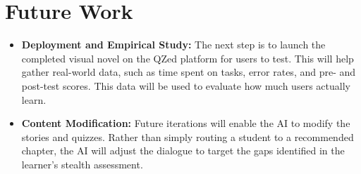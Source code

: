 \documentclass[12pt,a4paper]{report}
\begin{document}
\section{Future Work}

\begin{itemize}
    \item \textbf{Deployment and Empirical Study:} The next step is to launch the completed visual novel on the QZed platform for users to test. This will help gather real-world data, such as time spent on tasks, error rates, and pre- and post-test scores. This data will be used to evaluate how much users actually learn.

    \item \textbf{Content Modification:} Future iterations will enable the AI to modify the stories and quizzes. Rather than simply routing a student to a recommended chapter, the AI will adjust the dialogue to target the gaps identified in the learner's stealth assessment.
\end{itemize}
\end{document}
